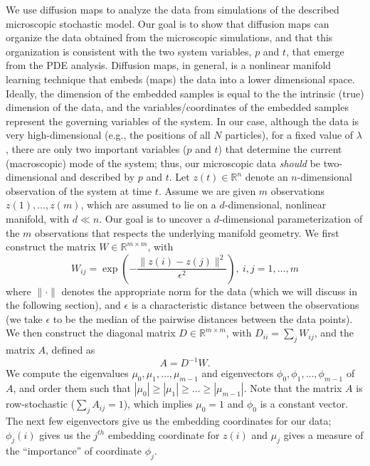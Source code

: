 \documentclass[prl, reprint, final, showkeys]{revtex4-1}
\begin{document}
We use diffusion maps \cite{coifman2005geometric} to analyze the data from simulations of the described microscopic stochastic model.
%
Our goal is to show that diffusion maps can organize the data obtained from the microscopic simulations, and that this organization is consistent with the two system variables, $p$ and $t$, that emerge from the PDE analysis.
%
Diffusion maps, in general, is a nonlinear manifold learning technique that embeds (maps) the data into a lower dimensional space. Ideally, the dimension of the embedded samples is equal to the the intrinsic (true) dimension of the data, and the variables/coordinates of the embedded samples represent the governing variables of the system.
%
In our case, although the data is very high-dimensional (e.g., the positions of all $N$ particles), for a fixed value of $\lambda$, there are only two important variables ($p$ and $t$) that determine the current (macroscopic) mode of the system; thus, our microscopic data {\em should} be two-dimensional and described by $p$ and $t$.
%
Let $z(t) \in \mathbb{R}^n$ denote an $n$-dimensional observation of the system at time $t$. Assume we are given $m$ observations $z(1), \dots, z(m)$, which are assumed to lie on a $d$-dimensional, nonlinear manifold, with $d \ll n$. Our goal is to uncover a $d$-dimensional parameterization of the $m$ observations that respects the underlying manifold geometry.
%
We first construct the matrix $W \in \mathbb{R}^{m \times m}$, with
\begin{equation} \label{eq:W}
W_{ij} = \exp \left( -\frac{\|z(i) - z(j) \|^2}{\epsilon^2} \right), \ i,j=1,\ldots,m
\end{equation}
where $\| \cdot \|$ denotes the appropriate norm for the data (which we will discuss in the following section), and $\epsilon$ is a characteristic distance between the observations (we take $\epsilon$ to be the median of the pairwise distances between the data points).
%
We then construct the diagonal matrix $D \in \mathbb{R}^{m \times m}$, with $D_{ii} = \sum_j W_{ij}$, and the matrix $A$, defined as
\begin{equation}
A = D^{-1} W.
\end{equation}
%
We compute the eigenvalues $\mu_0, \mu_1, \dots, \mu_{m-1}$ and eigenvectors $\phi_0, \phi_1, \dots, \phi_{m-1}$ of $A$, and order them such that $|\mu_0| \ge |\mu_1| \ge \dots \ge |\mu_{m-1}|$. 
%
Note that the matrix $A$ is row-stochastic ($\sum_j A_{ij} = 1$), which implies $\mu_0 = 1$ and $\phi_0$ is a constant vector.
%
The next few eigenvectors give us the embedding coordinates for our data;
$\phi_{j}(i)$ gives us the $j^{th}$ embedding coordinate for $z(i)$ and
$\mu_j$ gives a measure of the ``importance'' of coordinate $\phi_j$.
\end{document}
